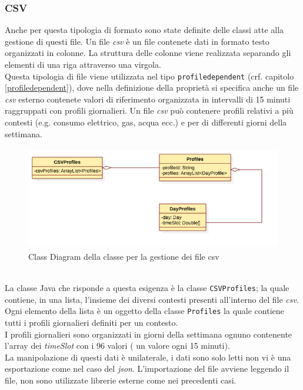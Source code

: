 \documentclass[12pt,a4paper,italian]{article}
\begin{document}
	\subsubsection{CSV}
	Anche per questa tipologia di formato sono state definite delle classi atte alla gestione di questi file. Un file \emph{csv} è un file contenete dati in formato testo organizzati in colonne. La struttura delle colonne viene realizzata separando gli elementi di una riga attraverso una virgola.\\
	Questa tipologia di file viene utilizzata nel tipo \texttt{profiledependent} (crf. capitolo \ref{profiledependent}), dove nella definizione della proprietà si specifica anche un file \emph{csv} esterno contenete valori di riferimento organizzata in intervalli di 15 minuti raggruppati con profili giornalieri. Un file \emph{csv} può contenere  profili relativi a più contesti (e.g. consumo elettrico, gas, acqua ecc.) e per di differenti giorni della settimana.
		\begin{figure}[h!]
			\centering
			\includegraphics[height=4.5cm]{img/csv.png}
			\caption{Class Diagram della classe per la gestione dei file csv}\label{csvClass}
		\end{figure}\\
	La classe Java che risponde a questa esigenza è la classe \texttt{CSVProfiles}; la quale contiene, in una lista, l'insieme dei diversi contesti presenti all'interno del file \emph{csv}.
	Ogni elemento della lista è un oggetto della classe \texttt{Profiles} la quale contiene tutti i profili giornalieri definiti per un contesto.\\ I profili giornalieri sono organizzati in giorni della settimana ognuno contenente l'array dei \emph{timeSlot} con i 96 valori ( un valore ogni 15 minuti).\\
	La manipolazione di questi dati è unilaterale, i dati sono solo letti non vi è una esportazione come nel caso del \emph{json}. L'importazione del file avviene leggendo il file, non sono utilizzate librerie esterne come nei precedenti casi.
	
\end{document}
